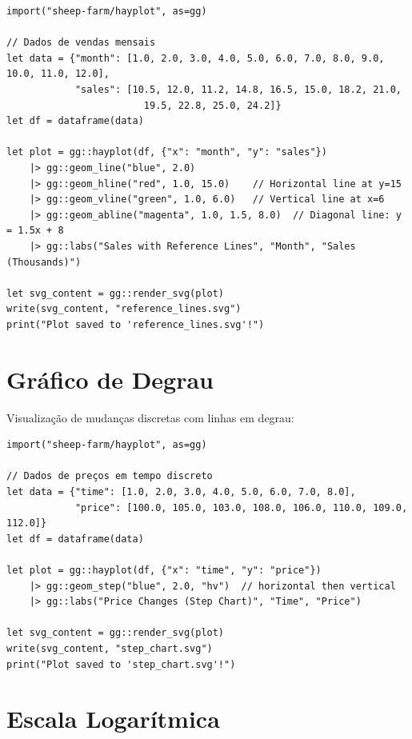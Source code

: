 \documentclass[12pt, a4paper, oneside]{book}
\begin{document}
\begin{lstlisting}[caption={examples/reference\_lines.hay}]
import("sheep-farm/hayplot", as=gg)

// Dados de vendas mensais
let data = {"month": [1.0, 2.0, 3.0, 4.0, 5.0, 6.0, 7.0, 8.0, 9.0, 10.0, 11.0, 12.0],
            "sales": [10.5, 12.0, 11.2, 14.8, 16.5, 15.0, 18.2, 21.0,
                        19.5, 22.8, 25.0, 24.2]}
let df = dataframe(data)

let plot = gg::hayplot(df, {"x": "month", "y": "sales"})
    |> gg::geom_line("blue", 2.0)
    |> gg::geom_hline("red", 1.0, 15.0)    // Horizontal line at y=15
    |> gg::geom_vline("green", 1.0, 6.0)   // Vertical line at x=6
    |> gg::geom_abline("magenta", 1.0, 1.5, 8.0)  // Diagonal line: y = 1.5x + 8
    |> gg::labs("Sales with Reference Lines", "Month", "Sales (Thousands)")

let svg_content = gg::render_svg(plot)
write(svg_content, "reference_lines.svg")
print("Plot saved to 'reference_lines.svg'!")
\end{lstlisting}

\section{Gráfico de Degrau}

Visualização de mudanças discretas com linhas em degrau:

\begin{lstlisting}[caption={examples/step\_chart.hay}]
import("sheep-farm/hayplot", as=gg)

// Dados de preços em tempo discreto
let data = {"time": [1.0, 2.0, 3.0, 4.0, 5.0, 6.0, 7.0, 8.0],
            "price": [100.0, 105.0, 103.0, 108.0, 106.0, 110.0, 109.0, 112.0]}
let df = dataframe(data)

let plot = gg::hayplot(df, {"x": "time", "y": "price"})
    |> gg::geom_step("blue", 2.0, "hv")  // horizontal then vertical
    |> gg::labs("Price Changes (Step Chart)", "Time", "Price")

let svg_content = gg::render_svg(plot)
write(svg_content, "step_chart.svg")
print("Plot saved to 'step_chart.svg'!")
\end{lstlisting}

\section{Escala Logarítmica}
\end{document}
